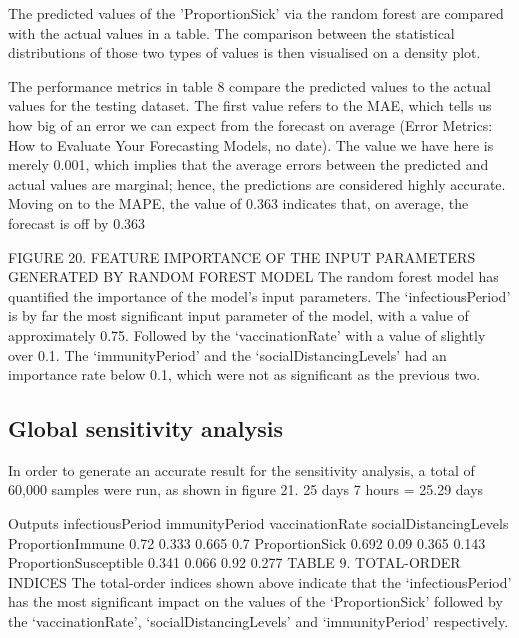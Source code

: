 \documentclass[smallextended]{svjour3}       %
\begin{document}
The predicted values of the 'ProportionSick' via the random forest are compared with the actual values in a table. The comparison between the statistical distributions of those two types of values is then visualised on a density plot.

The performance metrics in table 8 compare the predicted values to the actual values for the testing dataset. The first value refers to the MAE, which tells us how big of an error we can expect from the forecast on average (Error Metrics: How to Evaluate Your Forecasting Models, no date). The value we have here is merely 0.001, which implies that the average errors between the predicted and actual values are marginal; hence, the predictions are considered highly accurate. Moving on to the MAPE, the value of 0.363 indicates that, on average, the forecast is off by 0.363%



FIGURE 20. FEATURE IMPORTANCE OF THE INPUT PARAMETERS GENERATED BY RANDOM FOREST MODEL
The random forest model has quantified the importance of the model’s input parameters. The ‘infectiousPeriod’ is by far the most significant input parameter of the model, with a value of approximately 0.75. Followed by the ‘vaccinationRate’ with a value of slightly over 0.1. The ‘immunityPeriod’ and the ‘socialDistancingLevels’ had an importance rate below 0.1, which were not as significant as the previous two.


\subsection{Global sensitivity analysis}


In order to generate an accurate result for the sensitivity analysis, a total of 60,000 samples were run, as shown in figure 21.
25 days 7 hours = 25.29 days

Outputs infectiousPeriod
immunityPeriod vaccinationRate socialDistancingLevels
ProportionImmune
0.72
0.333
0.665
0.7
ProportionSick 0.692 0.09 0.365 0.143 ProportionSusceptible 0.341 0.066 0.92 0.277
TABLE 9. TOTAL-ORDER INDICES
The total-order indices shown above indicate that the ‘infectiousPeriod’ has the most significant impact on the values of the ‘ProportionSick’ followed by the ‘vaccinationRate’, ‘socialDistancingLevels’ and ‘immunityPeriod’ respectively.
\end{document}
